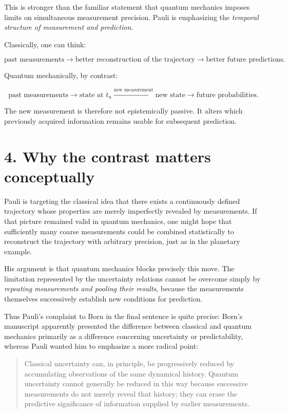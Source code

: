 This is stronger than the familiar statement that quantum mechanics imposes limits on simultaneous measurement precision. Pauli is emphasizing the \emph{temporal structure of measurement and prediction}.

Classically, one can think:

\begin{equation*}
\text{past measurements}
\longrightarrow
\text{better reconstruction of the trajectory}
\longrightarrow
\text{better future predictions}.
\end{equation*}

Quantum mechanically, by contrast:

\begin{equation*}
\text{past measurements}
\longrightarrow
\text{state at }t_n
\xrightarrow{\text{new measurement}}
\text{new state}
\longrightarrow
\text{future probabilities}.
\end{equation*}

The new measurement is therefore not epistemically passive. It alters which previously acquired information remains usable for subsequent prediction.

\section*{4. Why the contrast matters conceptually}

Pauli is targeting the classical idea that there exists a continuously defined trajectory whose properties are merely imperfectly revealed by measurements. If that picture remained valid in quantum mechanics, one might hope that sufficiently many coarse measurements could be combined statistically to reconstruct the trajectory with arbitrary precision, just as in the planetary example.

His argument is that quantum mechanics blocks precisely this move. The limitation represented by the uncertainty relations cannot be overcome simply by \emph{repeating measurements and pooling their results}, because the measurements themselves successively establish new conditions for prediction.


Thus Pauli's complaint to Born in the final sentence is quite precise: Born's manuscript apparently presented the difference between classical and quantum mechanics primarily as a difference concerning uncertainty or predictability, whereas Pauli wanted him to emphasize a more radical point:

\begin{quote}
Classical uncertainty can, in principle, be progressively reduced by accumulating observations of the same dynamical history. Quantum uncertainty cannot generally be reduced in this way because successive measurements do not merely reveal that history; they can erase the predictive significance of information supplied by earlier measurements.
\end{quote}

